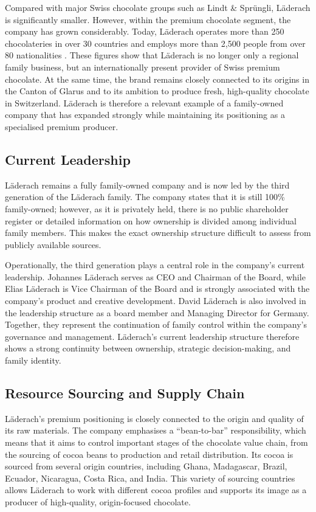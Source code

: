 Compared with major Swiss chocolate groups such as Lindt \& Sprüngli, Läderach is
significantly smaller. However, within the premium chocolate segment, the company
has grown considerably. Today, Läderach operates more than 250 chocolateries in
over 30 countries and employs more than 2,500 people from over 80 nationalities
\cite{laderachOfficialWebsite}. These figures show that Läderach is no longer
only a regional family business, but an internationally present provider of Swiss
premium chocolate. At the same time, the brand remains closely connected to its
origins in the Canton of Glarus and to its ambition to produce fresh,
high-quality chocolate in Switzerland. Läderach is therefore a relevant example
of a family-owned company that has expanded strongly while maintaining its
positioning as a specialised premium producer.

\subsection{Current Leadership}

Läderach remains a fully family-owned company and is now led by the third
generation of the Läderach family. The company states that it is still 100\%
family-owned; however, as it is privately held, there is no public shareholder
register or detailed information on how ownership is divided among individual
family members. This makes the exact ownership structure difficult to assess from
publicly available sources.

Operationally, the third generation plays a central role in the company’s current
leadership. Johannes Läderach serves as CEO and Chairman of the Board, while
Elias Läderach is Vice Chairman of the Board and is strongly associated with the
company’s product and creative development. David Läderach is also involved in
the leadership structure as a board member and Managing Director for Germany.
Together, they represent the continuation of family control within the company’s
governance and management. Läderach’s current leadership structure therefore
shows a strong continuity between ownership, strategic decision-making, and
family identity.

\subsection{Resource Sourcing and Supply Chain}

Läderach’s premium positioning is closely connected to the origin and quality of
its raw materials. The company emphasises a ``bean-to-bar'' responsibility, which
means that it aims to control important stages of the chocolate value chain, from
the sourcing of cocoa beans to production and retail distribution. Its cocoa is
sourced from several origin countries, including Ghana, Madagascar, Brazil,
Ecuador, Nicaragua, Costa Rica, and India. This variety of sourcing countries
allows Läderach to work with different cocoa profiles and supports its image as a
producer of high-quality, origin-focused chocolate.

